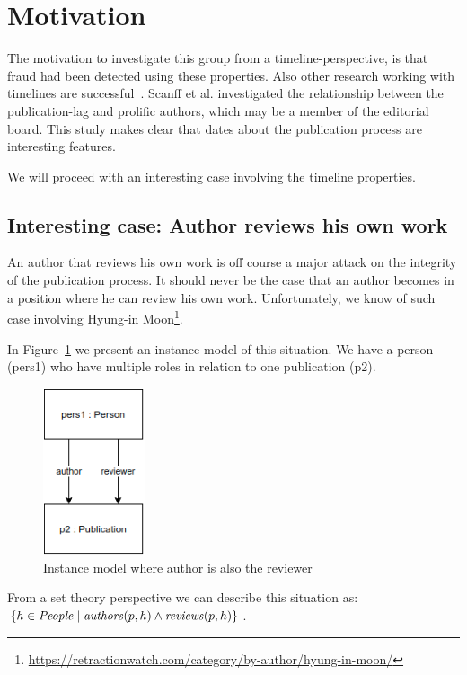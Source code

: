 \documentclass{ou-report}
\begin{document}
\section{Motivation}
The motivation to investigate this group from a timeline-perspective, is that
fraud had been detected using these properties. Also other research working with
timelines are successful~\cite{SNCMBL2021}. Scanff et al. investigated the 
relationship between the publication-lag and prolific authors, which may be a 
member of the editorial board. This study makes clear that dates about the
publication process are interesting features.  

We will proceed with an interesting case involving the timeline properties.
\subsection{Interesting case: Author reviews his own work}
\label{interesting_case:author_reviews_own_work}
An author that reviews his own work is off course a major attack on the
integrity of the publication process. It should never be the case that an author
becomes in a position where he can review his own work. Unfortunately, we know
of such case involving Hyung-in
Moon\footnote{\url{https://retractionwatch.com/category/by-author/hyung-in-moon/}}. 

In Figure~\ref{fig:air} we present an instance model of this situation. We have 
a person (pers1) who have multiple roles in relation to one publication (p2).

\begin{figure}[H]
\centering
\includegraphics[width=3cm]{images/author_is_reviewer.drawio.png}
\caption{Instance model where author is also the reviewer}
\label{fig:air}
\end{figure}
From a set theory perspective we can describe this situation as: 
$\{h \in \mathit{People} \mid \mathit{authors}(p, h) \land \mathit{reviews}(p, h)\}$.
\end{document}
